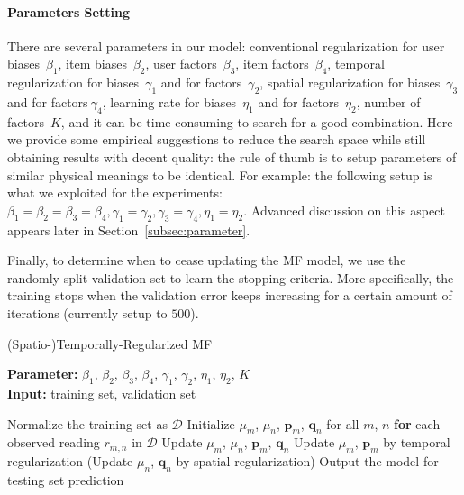 \paragraph*{Parameters Setting}
There are several parameters in our model: conventional regularization for user biases~$\beta_1$, item biases~$\beta_2$, user factors~$\beta_3$, item factors~$\beta_4$, temporal regularization for biases~$\gamma_1$ and for factors~$\gamma_2$, spatial regularization for biases~$\gamma_3$ and for factors$~\gamma_4$, learning rate for biases~$\eta_1$ and for factors~$\eta_2$, number of factors~$K$, and it can be time consuming to search for a good combination. 
Here we provide some empirical suggestions to reduce the search space while still obtaining results with decent quality: the rule of thumb is to setup parameters of similar physical meanings to be identical. For example: the following setup is what we exploited for the experiments:
$ \beta_1 = \beta_2 = \beta_3 = \beta_4, \gamma_1 = \gamma_2, \gamma_3 = \gamma_4, \eta_1 = \eta_2$. %
Advanced discussion on this aspect appears later in Section~\ref{subsec:parameter}.

Finally, to determine when to cease updating the MF model, we use the randomly split validation set to learn the stopping criteria. More specifically, the training stops when the validation error keeps increasing for a certain amount of iterations (currently setup to $500$). 

\begin{algorithm}
	\caption{(Spatio-)Temporally-Regularized MF}
	\label{alg:STRMF}
	\textbf{Parameter:} $\beta_1$, $\beta_2$, $\beta_3$, $\beta_4$, $\gamma_1$, $\gamma_2$, $\eta_1$, $\eta_2$, $K$\\
	\textbf{Input:} training set, validation set
	\begin{algorithmic}
		\State Normalize the training set as $\mathcal{D}$
		\State Initialize $\mu_m$, $\mu_n$, $\mathbf{p}_m$, $\mathbf{q}_n$ for all $m$, $n$
		\Repeat
			\State \textbf{for} each observed reading $r_{m,n}$ in $\mathcal{D}$
				\State \indent Update $\mu_m$, $\mu_n$, $\mathbf{p}_{m}$, $\mathbf{q}_{n}$
			\State Update $\mu_m$, $\mathbf{p}_m$ by temporal regularization
			\State (Update $\mu_n$, $\mathbf{q}_n$ by spatial regularization)
		\State Output the model for testing set prediction
	\end{algorithmic}
\end{algorithm}
